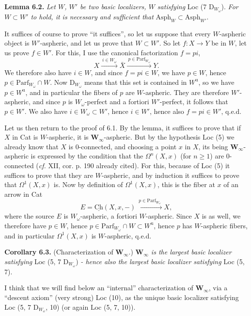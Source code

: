 \documentclass[11pt]{article}
\newcommand{\printedpage}[1]{\marginpar{\footnotesize p.~#1}}
\newcommand{\msp}[1]{\marginpar{\footnotesize [#1]}}
\begin{document}
\textbf{Lemma 6.2.} \textit{Let $W$, $W'$ be two basic localizers, $W$ satisfying} Loc (7 D$_{W_\omega}$). \textit{For $W \subset W'$ to hold, it is necessary and sufficient that} $\mathrm{Asph}_W \subset \mathrm{Asph}_{W'}$.

\msp{page 84}
It suffices of course to prove ``it suffices'', so let us suppose that every $W$-aspheric object is $W'$-aspheric, and let us prove that $W \subset W'$. So let $f : X \longrightarrow Y$ be in $W$, let us prove $f \in W'$. For this, I use the canonical factorization $f = pi$,
\[ X \xrightarrow{\ i \in W_\omega\ } \bar{X} \xrightarrow{\ p \in \mathrm{Parf}_{W_\omega}\ } Y. \]
\printedpage{45}
We therefore also have $i \in W$, and since $f = pi \in W$, we have $p \in W$, hence $p \in \mathrm{Parf}_{W_\omega} \cap W$. Now D$_{W_\omega}$ means that this set is contained in $W^{\mathrm{u}}$, so we have $p \in W^{\mathrm{u}}$, and in particular the fibers of $p$ are $W$-aspheric. They are therefore $W'$-aspheric, and since $p$ is $W_\omega$-perfect and a fortiori $W'$-perfect, it follows that $p \in W'$. We also have $i \in W_\omega \subset W'$, hence $i \in W'$, hence also $f = pi \in W'$, q.e.d.

Let us then return to the proof of 6.1. By the lemma, it suffices to prove that if $X$ in Cat is $W$-aspheric, it is $\mathbf{W}_\infty$-aspheric. But by the hypothesis Loc (5) we already know that $X$ is 0-connected, and choosing a point $x$ in $X$, its being $\mathbf{W}_\infty$-aspheric is expressed by the condition
\msp{page 85}
that the $\Omega^n(X,x)$ (for $n \geq 1$) are 0-connected (\textit{cf.} XII, cor. p. 190 already cited). For this, because of Loc (5) it suffices to prove that they are $W$-aspheric, and by induction it suffices to prove that $\Omega^1(X,x)$ is. Now by definition of $\Omega^1(X,x)$, this is the fiber at $x$ of an arrow in Cat
\[ E = \underline{\mathrm{Ch}}(X,x,-) \xrightarrow{\ p \in \mathrm{Parf}_{W_\omega}\ } X, \]
where the source $E$ is $W_\omega$-aspheric, a fortiori $W$-aspheric. Since $X$ is as well, we therefore have $p \in W$, hence $p \in \mathrm{Parf}_{W_\omega} \cap W \subset W^{\mathrm{u}}$, hence $p$ has $W$-aspheric fibers, and in particular $\Omega^1(X,x)$ is $W$-aspheric, q.e.d.

\textbf{Corollary 6.3.} (Characterization of $\mathbf{W}_\infty$.) \textit{$\mathbf{W}_\infty$ is the largest basic localizer satisfying} Loc (5, 7 D$_{W_\omega}$) \textit{- hence also the largest basic localizer satisfying} Loc (5, 7).

I think that we will find below an ``internal'' characterization of $\mathbf{W}_\infty$, via a ``descent axiom'' (very strong) Loc (10),
\msp{page 86}
as the unique basic localizer satisfying Loc (5, 7 D$_{W_\omega}$, 10) (or again Loc (5, 7, 10)).
\end{document}
